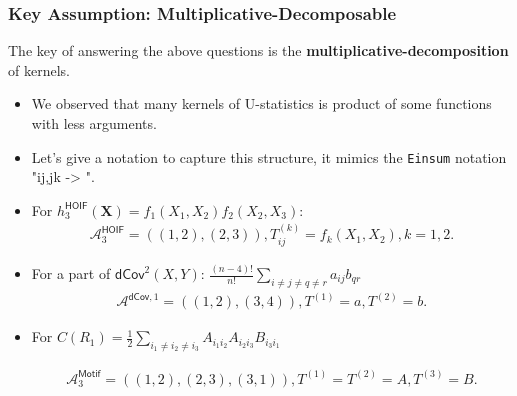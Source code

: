 \documentclass[9pt]{beamer}
\def\calA{\mathcal{A}}
\theoremstyle{mystyle}
\theoremstyle{mystyletwo}
\begin{document}


\begin{frame}
    \frametitle{Key Assumption: Multiplicative-Decomposable}
    The key of answering the above questions is the \textbf{multiplicative-decomposition} of kernels.
    \begin{itemize}
        \item We observed that many kernels of U-statistics is product of some functions with less arguments.
        \item Let's give a notation to capture this structure, it mimics the \texttt{Einsum} notation "ij,jk -> ".
        \item For $h^{\mathsf{HOIF}}_3(\bm{X}) = f_1(X_1,X_2) f_2(X_2,X_3) $:
        \begin{align*}
           \calA^{\mathsf{HOIF}}_3 = ((1,2),(2,3)), T^{(k)}_{ij} = f_k(X_1,X_2), k =1,2.
        \end{align*}

        \pause
        
        \item For a part of $\mathsf{dCov}^2(X, Y)$: $ \frac{(n-4)!}{n!} \sum_{i \neq j \neq q \neq r}
                  a_{ij}b_{qr}$
        \begin{align*}
            \calA^{\mathsf{dCov},1} = ((1,2),(3,4)), T^{(1)} = a, T^{(2)} = b.               
        \end{align*}

        \pause
        
        \item For  $C(R_1) = \frac{1}{2} \sum_{ i_1 \neq i_2 \neq i_3}  A_{i_1 i_2} A_{i_2 i_3}  B_{i_3 i_1}$

        \begin{align*}
           \calA^{\mathsf{Motif}}_3 = ((1,2),(2,3),(3,1)), T^{(1)} = T^{(2)} = A, T^{(3)} = B.            
        \end{align*}

    \end{itemize}
\end{frame}
\end{document}
